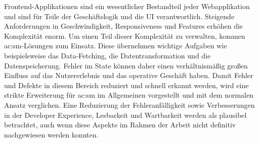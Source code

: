 Frontend-Applikationen sind ein wesentlicher Bestandteil jeder Webapplikation und sind für Teile der Geschäftslogik und die UI verantwortlich. Steigende Anforderungen in Geschwindigkeit, Responsiveness und Features erhöhen die Komplexität enorm. Um einen Teil dieser Komplexität zu verwalten, kommen \acrlong{ac:sm}-Lösungen zum Einsatz. Diese übernehmen wichtige Aufgaben wie beispielsweise das Data-Fetching, die Datentransformation und die Datenspeicherung. Fehler im State können daher einen verhältnismäßig großen Einfluss auf das Nutzererlebnis und das operative Geschäft haben. Damit Fehler und Defekte in diesem Bereich reduziert und schnell erkannt werden, wird eine strikte Erweiterung für \acrlong{ac:sm} im Allgemeinen vorgestellt und mit dem normalen Ansatz verglichen. Eine Reduzierung der Fehleranfälligkeit sowie Verbesserungen in der Developer Experience, Lesbarkeit und Wartbarkeit werden als plausibel betrachtet, auch wenn diese Aspekte im Rahmen der Arbeit nicht definitiv nachgewiesen werden konnten.